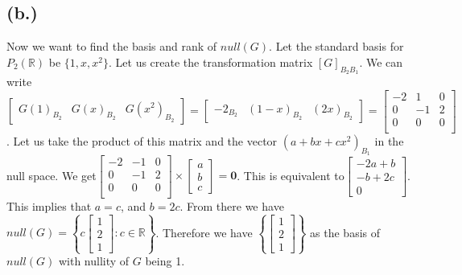 \documentclass{article}
\begin{document}
	\subsection*{(b.)}
		Now we want to find the basis and rank of $null(G)$. Let the standard basis for $P_2(\mathbb{R})$ be $\{1, x, x^2\}$.
		Let us create the transformation matrix $[G]_{B_2B_1}$. We can write
		$\begin{bmatrix}
			G(1)_{B_2} & G(x)_{B_2} & G(x^2)_{B_2}
		\end{bmatrix} = 
		\begin{bmatrix}
			-2_{B_2} & (1-x)_{B_2} & (2x)_{B_2}
		\end{bmatrix} = 
		\begin{bmatrix}
			-2 & 1 & 0\\
			0 & -1 & 2\\
			0 & 0 & 0\\

		\end{bmatrix}
		$. Let us take the product of this matrix and the vector $(a + bx + cx^2)_{B_1}$ in the null space.
		We get$
		\begin{bmatrix}
			-2 & -1 & 0\\
			0 & -1 & 2\\
			0 & 0 & 0 \\
		\end{bmatrix} \times
		\begin{bmatrix}
			a \\
			b \\
			c
		\end{bmatrix} = \mathbf{0}$.
		This is equivalent to$
		\begin{bmatrix}
			-2a+b \\
			-b+2c \\
			0
		\end{bmatrix}$. This implies that $a = c$, and $b=2c$.
		From there we have $null(G) = \left\{ c \begin{bmatrix}1 \\ 2 \\ 1\end{bmatrix} : c \in \mathbb{R} \right\}$.
		Therefore we have $\left\{\begin{bmatrix}1\\2\\1\end{bmatrix}\right\}$ as the basis of $null(G)$ with nullity of $G$ being 1.
\end{document}

